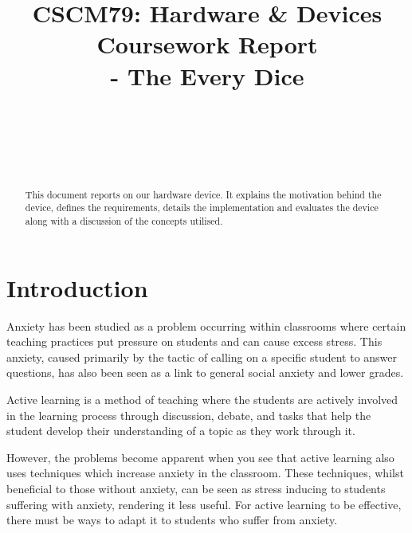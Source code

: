 \documentclass{sigchi}
\begin{document}
\title{CSCM79: Hardware \& Devices Coursework Report \\- The Every Dice}

\author{%
  \\
  \\
  \\
  \\
}

\maketitle

\begin{abstract}

 This document reports on our hardware device. It explains the motivation behind the device, defines the requirements, details the implementation and evaluates the device along with a discussion of the concepts utilised.

\end{abstract}

\section{Introduction}

Anxiety has been studied as a problem occurring within classrooms where certain teaching practices put pressure on students and can cause excess stress. This anxiety, caused primarily by the tactic of calling on a specific student to answer questions, has also been seen as a link to general social anxiety and lower grades.  

Active learning is a method of teaching where the students are actively involved in the learning process through discussion, debate, and tasks that help the student develop their understanding of a topic as they work through it. 

However, the problems become apparent when you see that active learning also uses techniques which increase anxiety in the classroom. These techniques, whilst beneficial to those without anxiety, can be seen as stress inducing to students suffering with anxiety, rendering it less useful. For active learning to be effective, there must be ways to adapt it to students who suffer from anxiety. 
\end{document}
